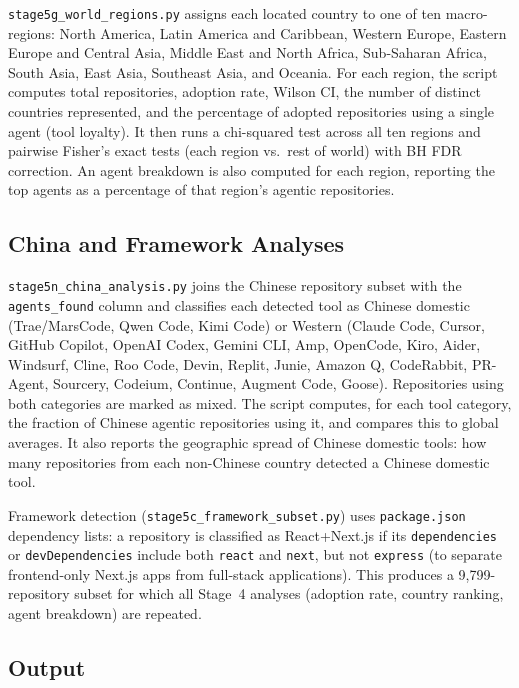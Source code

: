 \texttt{stage5g\_world\_regions.py} assigns each located country to one of ten macro-regions: North America, Latin America and Caribbean, Western Europe, Eastern Europe and Central Asia, Middle East and North Africa, Sub-Saharan Africa, South Asia, East Asia, Southeast Asia, and Oceania. For each region, the script computes total repositories, adoption rate, Wilson CI, the number of distinct countries represented, and the percentage of adopted repositories using a single agent (tool loyalty). It then runs a chi-squared test across all ten regions and pairwise Fisher's exact tests (each region vs.\ rest of world) with BH FDR correction. An agent breakdown is also computed for each region, reporting the top agents as a percentage of that region's agentic repositories.

\subsection{China and Framework Analyses}

\texttt{stage5n\_china\_analysis.py} joins the Chinese repository subset with the \texttt{agents\_found} column and classifies each detected tool as Chinese domestic (Trae/MarsCode, Qwen Code, Kimi Code) or Western (Claude Code, Cursor, GitHub Copilot, OpenAI Codex, Gemini CLI, Amp, OpenCode, Kiro, Aider, Windsurf, Cline, Roo Code, Devin, Replit, Junie, Amazon Q, CodeRabbit, PR-Agent, Sourcery, Codeium, Continue, Augment Code, Goose). Repositories using both categories are marked as mixed. The script computes, for each tool category, the fraction of Chinese agentic repositories using it, and compares this to global averages. It also reports the geographic spread of Chinese domestic tools: how many repositories from each non-Chinese country detected a Chinese domestic tool.

Framework detection (\texttt{stage5c\_framework\_subset.py}) uses \texttt{package.json} dependency lists: a repository is classified as React+Next.js if its \texttt{dependencies} or \texttt{devDependencies} include both \texttt{react} and \texttt{next}, but not \texttt{express} (to separate frontend-only Next.js apps from full-stack applications). This produces a 9,799-repository subset for which all Stage~4 analyses (adoption rate, country ranking, agent breakdown) are repeated.

\subsection{Output}

